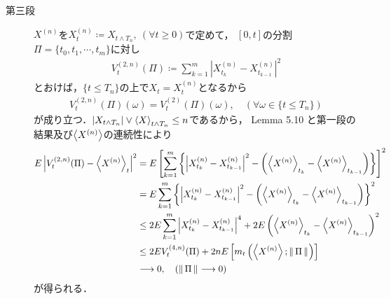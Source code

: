 \begin{prf}
\begin{description}
			\item[第三段]
				$X^{(n)}$を$X^{(n)}_t \coloneqq X_{t \wedge T_n},\ (\forall t \geq 0)$で定めて，
				$[0,t]$の分割$\Pi = \{t_0,t_1,\cdots,t_m\}$に対し
				\begin{align}
					V^{(2,n)}_t(\Pi) \coloneqq \sum_{k=1}^m \left|X^{(n)}_{t_k} - X^{(n)}_{t_{k-1}}\right|^2
				\end{align}
				とおけば，$\{t \leq T_n\}$の上で$X_t = X^{(n)}_t$となるから
				\begin{align}
					V^{(2,n)}_t(\Pi)(\omega) = V^{(2)}_t(\Pi)(\omega),
					\quad \left(\forall \omega \in \{t \leq T_n\}\right)
					\label{eq:chapter_1_theorem_5_8_2}
				\end{align}
				が成り立つ．$\left|X_{t \wedge T_n}\right| \vee \inprod<X>_{t \wedge T_n} \leq n$であるから，
				Lemma 5.10 と第一段の結果及び$\inprod<X^{(n)}>$の連続性により
				\begin{align}
					E \left| V_t^{(2,n)}(\Pi) - \inprod<X^{(n)}>_t \right|^2
					&= E \left[ \sum_{k=1}^m \left\{\left|X^{(n)}_{t_k} - X^{(n)}_{t_{k-1}}\right|^2 
						- \left(\inprod<X^{(n)}>_{t_k} - \inprod<X^{(n)}>_{t_{k-1}}\right)\right\} \right]^2 \\
					&= E \sum_{k=1}^m \left\{ \left|X^{(n)}_{t_k} - X^{(n)}_{t_{k-1}}\right|^2 
						- \left(\inprod<X^{(n)}>_{t_k} - \inprod<X^{(n)}>_{t_{k-1}}\right) \right\}^2 \\
					&\leq 2 E \sum_{k=1}^m \left|X^{(n)}_{t_k} - X^{(n)}_{t_{k-1}}\right|^4
						+ 2 E \left(\inprod<X^{(n)}>_{t_k} - \inprod<X^{(n)}>_{t_{k-1}}\right)^2 \\
					&\leq 2 E V_t^{(4,n)}(\Pi) 
						+ 2 n E \left[ m_t\left(\inprod<X^{(n)}>;\Norm{\Pi}{}\right) \right] \\
					&\longrightarrow 0,\quad (\Norm{\Pi}{} \longrightarrow 0)
				\end{align}
				が得られる．
			

\end{description}
\end{prf}
